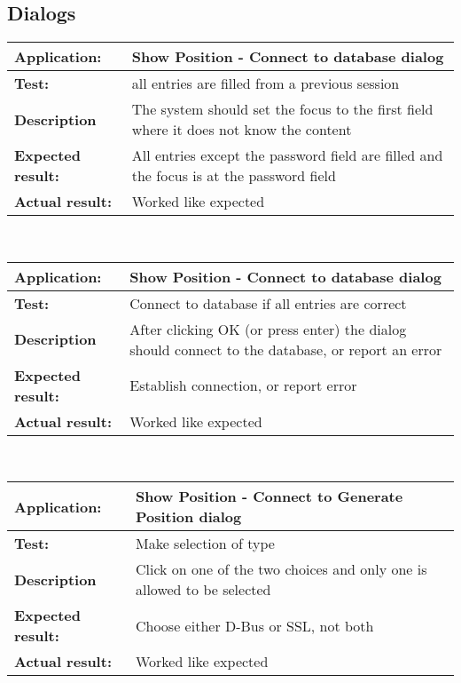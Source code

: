   \subsection{Dialogs}
   \begin{tabular}{|p{3.5cm}|p{10.5cm}|}
    \hline
     \textbf{Application:}	& Show Position - Connect to database dialog\\
    \hline
     \textbf{Test:}		& all entries are filled from a previous session\\
    \hline
     \textbf{Description}	& The system should set the focus to the first field where it does not know the content\\
    \hline
     \textbf{Expected result:}	& All entries except the password field are filled and the focus is at the password field\\
    \hline
     \textbf{Actual result:}	& Worked like expected\\
    \hline
   \end{tabular}\\
   \begin{tabular}{|p{3.5cm}|p{10.5cm}|}
    \hline
     \textbf{Application:}	& Show Position - Connect to database dialog\\
    \hline
     \textbf{Test:}		& Connect to database if all entries are correct\\
    \hline
     \textbf{Description}	& After clicking OK (or press enter) the dialog should connect to the database, or report an error\\
    \hline
     \textbf{Expected result:}	& Establish connection, or report error\\
    \hline
     \textbf{Actual result:}	& Worked like expected\\
    \hline
   \end{tabular}\\
   \begin{tabular}{|p{3.5cm}|p{10.5cm}|}
    \hline
     \textbf{Application:}	& Show Position - Connect to Generate Position dialog\\
    \hline
     \textbf{Test:}		& Make selection of type\\
    \hline
     \textbf{Description}	& Click on one of the two choices and only one is allowed to be selected\\
    \hline
     \textbf{Expected result:}	& Choose either D-Bus or SSL, not both\\
    \hline
     \textbf{Actual result:}	& Worked like expected\\
    \hline
   \end{tabular}\\
